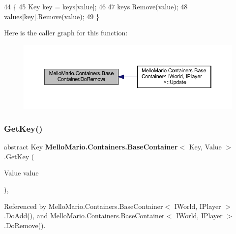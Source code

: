 \begin{DoxyCode}
44         \{
45             Key key = keys[value];
46 
47             keys.Remove(value);
48             values[key].Remove(value);
49         \}
\end{DoxyCode}
Here is the caller graph for this function\+:
\nopagebreak
\begin{figure}[H]
\begin{center}
\leavevmode
\includegraphics[width=350pt]{classMelloMario_1_1Containers_1_1BaseContainer_a8febada125f487cf10c14b1f65fa6437_icgraph}
\end{center}
\end{figure}
\mbox{\label{classMelloMario_1_1Containers_1_1BaseContainer_a73f9df110a2f12619e088e96991537fc}} 
\subsubsection{Get\+Key()}
{\footnotesize\ttfamily abstract Key \textbf{ Mello\+Mario.\+Containers.\+Base\+Container}$<$ Key, Value $>$.Get\+Key (\begin{DoxyParamCaption}\item[{Value}]{value }\end{DoxyParamCaption})\hspace{0.3cm}{\ttfamily [protected]}, {}}



Referenced by Mello\+Mario.\+Containers.\+Base\+Container$<$ I\+World, I\+Player $>$.\+Do\+Add(), and Mello\+Mario.\+Containers.\+Base\+Container$<$ I\+World, I\+Player $>$.\+Do\+Remove().

